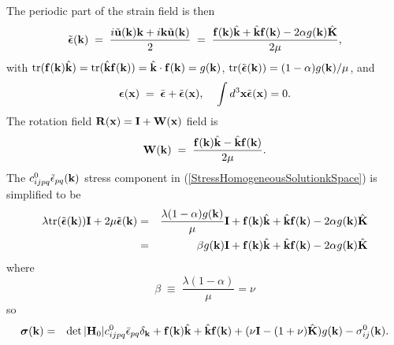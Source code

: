 \documentclass[12pt]{article}
\def\bmath#1{\mbox{\boldmath$#1$}}
\begin{document}
The periodic part of the strain field is then
\begin{equation}
 \tilde{\bmath{\epsilon}}({\bf k}) \;=\; \frac{i\tilde{\bf u}({\bf k}){\bf k}+i{\bf k}\tilde{\bf u}({\bf k})}{2} \;=\;
\frac{{\bf f}({\bf k})\hat{\bf k}+\hat{\bf k}{\bf f}({\bf k}) - 2\alpha g({\bf k})\hat{\bf K}}
 {2\mu},
\end{equation}
with ${\rm tr}({\bf f}({\bf k})\hat{\bf k})={\rm tr}(\hat{\bf k}{\bf
f}({\bf k}))=\hat{\bf k}\cdot {\bf f}({\bf k})=g({\bf k})$, ${\rm tr}(\tilde{\bmath{\epsilon}}({\bf k}))=(1-\alpha)g({\bf k})/\mu$, and
\begin{equation}
 \bmath{\epsilon}({\bf x}) \;=\; \bar{\bmath{\epsilon}} + 
 \tilde{\bmath{\epsilon}}({\bf x}), \;\;\;\;
 \int d^3{\bf x} \tilde{\bmath{\epsilon}}({\bf x}) = 0.
\end{equation}
The rotation field ${\bf R}({\bf x})={\bf I}+{\bf W}({\bf x})$ 
 field is
\begin{equation}
 {\bf W}({\bf k}) \;=\; 
\frac{{\bf f}({\bf k})\hat{\bf k}-\hat{\bf k}{\bf f}({\bf k})}
 {2\mu}.
\end{equation}
The $c_{ijpq}^0\tilde{\epsilon}_{pq}({\bf k})$
stress component in (\ref{StressHomogeneousSolutionkSpace}) is simplified to be
\begin{eqnarray}
 \lambda {\rm tr}(\tilde{\bmath{\epsilon}}({\bf k})){\bf I} + 2\mu \tilde{\bmath{\epsilon}}({\bf k})  =&&  
\frac{\lambda(1-\alpha)g({\bf k})}{\mu}{\bf I} + 
 {\bf f}({\bf k})\hat{\bf k}+\hat{\bf k}{\bf f}({\bf k}) - 2\alpha g({\bf k})\hat{\bf K} \nonumber\\
 =&& \beta g({\bf k}){\bf I} + {\bf f}({\bf k})\hat{\bf k}+\hat{\bf k}{\bf f}({\bf k}) - 2\alpha g({\bf k})\hat{\bf K}
\end{eqnarray}
where
\begin{equation}
 \beta \;\equiv\; \frac{\lambda(1-\alpha)}{\mu} = \nu
\end{equation}
so
\begin{eqnarray}
 \bmath{\sigma}({\bf k}) =&& \det|{\bf H}_0|c_{ijpq}^0\bar{\epsilon}_{pq}\delta_{\bf k} 
+ {\bf f}({\bf k})\hat{\bf k}+\hat{\bf k}{\bf f}({\bf k}) 
+ (\nu{\bf I}-(1+\nu)\hat{\bf K})g({\bf k})  - \sigma^0_{ij}({\bf k}).
\label{StressIsotropicHomogeneousSolutionkSpace2D}
\end{eqnarray}
\end{document}
